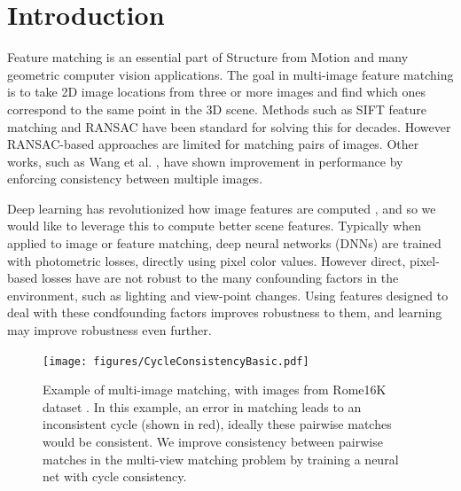 \documentclass[10pt,twocolumn,letterpaper]{article}
\begin{document}
\section{Introduction}

Feature matching is an essential part of Structure from Motion and many geometric computer vision applications.
The goal in multi-image feature matching is to take 2D image locations from three or more images and find which ones correspond to the same point in the 3D scene.
Methods such as SIFT feature matching \cite{lowe2004distinctive} and RANSAC \cite{fischler1981random} have been standard for solving this for decades.
However RANSAC-based approaches are limited for matching pairs of images.
Other works, such as Wang et al. \cite{wang2017multi}, have shown improvement in performance by enforcing consistency between multiple images.

Deep learning has revolutionized how image features are computed \cite{yi2016lift}, and so we would like to leverage this to compute better scene features.
Typically when applied to image or feature matching, deep neural networks (DNNs) are trained with photometric losses, directly using pixel color values.
However direct, pixel-based losses have are not robust to the many confounding factors in the environment, such as lighting and view-point changes.
Using features designed to deal with these condfounding factors improves robustness to them, 
and learning may improve robustness even further.

\begin{figure}[t]
\begin{center}
  \texttt{[image: figures/CycleConsistencyBasic.pdf]}
\end{center}
  \caption{
    Example of multi-image matching, with images from Rome16K dataset \cite{li2010location}.
    In this example, an error in matching leads to an inconsistent cycle (shown in red), ideally these pairwise matches would be consistent.
    We improve consistency between pairwise matches in the multi-view matching problem by training a neural net with cycle consistency.
  }
\label{fig:cycconsistex}
\label{fig:onecol}
\end{figure}
\end{document}
